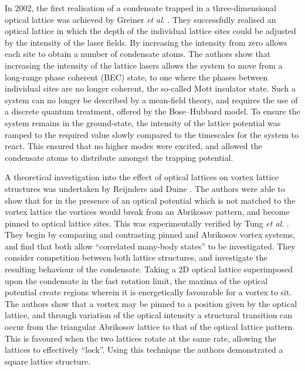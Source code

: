 In 2002, the first realisation of a condensate trapped in a three-dimensional optical lattice was achieved by Greiner \textit{et al}. \cite{OL:Greiner_nat_2002}. They successfully realised an optical lattice in which the depth of the individual lattice sites could be adjusted by the intensity of the laser fields. By increasing the intensity from zero allows each site to obtain a number of condensate atoms. The authors show that increasing the intensity of the lattice lasers allows the system to move from a long-range phase coherent (BEC) state, to one where the phases between individual sites are no longer coherent, the so-called Mott insulator state. Such a system can no longer be described by a mean-field theory, and requires the use of a discrete quantum treatment, offered by the Bose--Hubbard model. To ensure the system remains in the ground-state, the intensity of the lattice potential was ramped to the required value slowly compared to the timescales for the system to react. This ensured that no higher modes were excited, and allowed the condensate atoms to distribute amongst the trapping potential.

A theoretical investigation into the effect of optical lattices on vortex lattice structures was undertaken by Reijnders and Duine \cite{OL:Reijnders_prl_2004}. The authors were able to show that for in the presence of an optical potential which is not matched to the vortex lattice the vortices would break from an Abrikosov pattern, and become pinned to optical lattice sites. This was experimentally verified by Tung \textit{et al}. \cite{Vtx:Tung_prl_2006}. They begin by comparing and contrasting pinned and Abrikosov vortex systems, and find that both allow ``correlated many-body states'' to be investigated. They consider competition between both lattice structures, and investigate the resulting behaviour of the condensate. Taking a 2D optical lattice superimposed upon the condensate in the fast rotation limit, the maxima of the optical potential create regions wherein it is energetically favourable for a vortex to sit. The authors show that a vortex may be pinned to a position given by the optical lattice, and through variation of the optical intensity a structural transition can occur from the triangular Abrikosov lattice to that of the optical lattice pattern. This is favoured when the two lattices rotate at the same rate, allowing the lattices to effectively ``lock''. Using this technique the authors demonstrated a square lattice structure.

